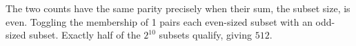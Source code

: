 The two counts have the same parity precisely when their sum, the subset size, is even. Toggling the membership of 1 pairs each even-sized subset with an odd-sized subset. Exactly half of the $2^{10}$ subsets qualify, giving $\boxed{512}$.
